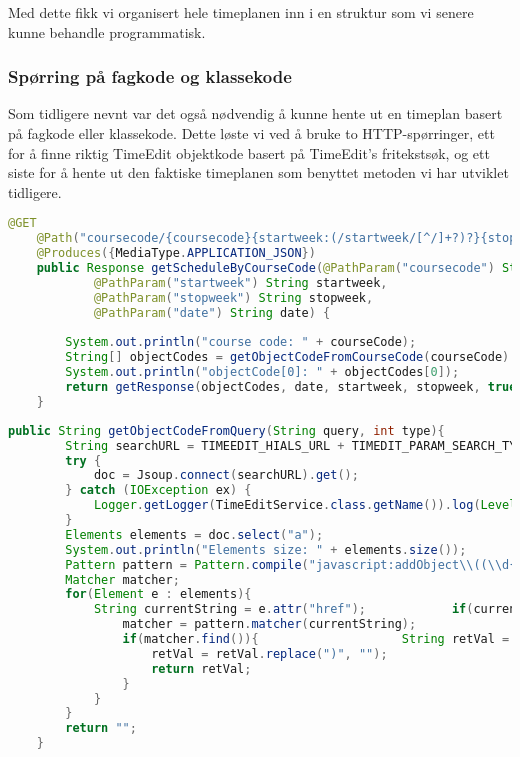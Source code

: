 \documentclass[../main.tex]{subfiles}
\begin{document}
Med dette fikk vi organisert hele timeplanen inn i en struktur som vi senere kunne behandle programmatisk.  

\subsubsection{Spørring på fagkode og klassekode}

Som tidligere nevnt var det også nødvendig å kunne hente ut en timeplan basert på fagkode eller klassekode. Dette løste vi ved å bruke to HTTP-spørringer, ett for å finne riktig TimeEdit objektkode basert på TimeEdit’s fritekstsøk, og ett siste for å hente ut den faktiske timeplanen som benyttet metoden vi har utviklet tidligere.

\begin{lstlisting}[language=Java, frame=single, caption={Utdrag fra en JAX-RS annotert REST resource metode i klassen TimeEditService}]
    @GET    
    @Path("coursecode/{coursecode}{startweek:(/startweek/[^/]+?)?}{stopweek:(/stopweek/[^/]+?)?}{date:(/date/[^/]+?)?}")
    @Produces({MediaType.APPLICATION_JSON})
    public Response getScheduleByCourseCode(@PathParam("coursecode") String courseCode,
            @PathParam("startweek") String startweek,
            @PathParam("stopweek") String stopweek,
            @PathParam("date") String date) {
        
        System.out.println("course code: " + courseCode);
        String[] objectCodes = getObjectCodeFromCourseCode(courseCode).split("/");
        System.out.println("objectCode[0]: " + objectCodes[0]);
        return getResponse(objectCodes, date, startweek, stopweek, true);
    }
\end{lstlisting}

\begin{lstlisting}[language=Java, frame=single, caption={Nytte-funksjon i klassen TimeEditService som bruker regulære uttrykk for å hente ut objektkoder}]
public String getObjectCodeFromQuery(String query, int type){
        String searchURL = TIMEEDIT_HIALS_URL + TIMEDIT_PARAM_SEARCH_TYPE + "=" + type + "&" + TIMEDIT_PARAM_SEARCH + "=" + query;        Document doc = null;
        try {
            doc = Jsoup.connect(searchURL).get();
        } catch (IOException ex) {
            Logger.getLogger(TimeEditService.class.getName()).log(Level.SEVERE, null, ex);
        }
        Elements elements = doc.select("a");
        System.out.println("Elements size: " + elements.size());
        Pattern pattern = Pattern.compile("javascript:addObject\\((\\d{6}|\\d{7})\\)");
        Matcher matcher;
        for(Element e : elements){
            String currentString = e.attr("href");            if(currentString != null && !currentString.isEmpty()){
                matcher = pattern.matcher(currentString);
                if(matcher.find()){                    String retVal = matcher.group().replace("javascript:addObject(", "");
                    retVal = retVal.replace(")", "");
                    return retVal;
                }
            }
        }
        return "";
    }
\end{lstlisting}
\end{document}
